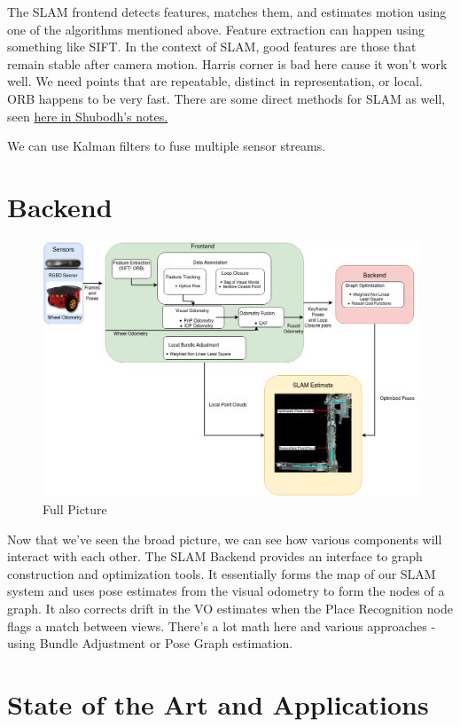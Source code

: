 The SLAM frontend detects features, matches them, and estimates motion using one of the algorithms mentioned above. Feature extraction can happen using something like SIFT. In the context of SLAM, good features are those that remain stable after camera motion. Harris corner is bad here cause it won't work well. We need points that are repeatable, distinct in representation, or local. ORB happens to be very fast. There are some direct methods for SLAM as well, seen \href{https://www.notion.so/SLAM-Frontend-Visual-Odometry-bd7dbccb797f442f955f450044ee200f#5346a971d36a4ac386c772228c7fe3bd}{here in Shubodh's notes.}

We can use Kalman filters to fuse multiple sensor streams.

\section{Backend}

\begin{figure}[h]
    \centering
    \includegraphics[width=12cm]{img/backend.png}
    \caption{Full Picture}
    \label{fig:slam}
\end{figure}

Now that we've seen the broad picture, we can see how various components will interact with each other. The SLAM Backend provides an interface to graph construction and optimization tools. It essentially forms the map of our SLAM system and uses pose estimates from the visual odometry to form the nodes of a graph. It also corrects drift in the VO estimates when the Place Recognition node flags a match between views. There's a lot math here and various approaches - using Bundle Adjustment or Pose Graph estimation.

\section{State of the Art and Applications}

